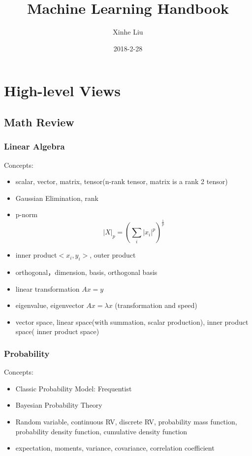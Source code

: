 \documentclass[11pt, openany]{book}              %
\title{\bf Machine Learning Handbook}    %
\author{Xinhe Liu}              %
\date{2018-2-28}                           %
\begin{document}
\maketitle                              %
\tableofcontents                        %
\mainmatter                             %

\part{High-level Views}
\chapter{Math Review}

\section{Linear Algebra}

Concepts:

\begin{itemize}
    \item scalar, vector, matrix, tensor(n-rank tensor, matrix is a rank 2 tensor) 
    \item Gaussian Elimination, rank
    \item p-norm $$|X|_p = (\sum_i |x_i|^p)^{\frac{1}{p}}$$
    \item inner product$<x_i,y_i>$, outer product
    \item orthogonal，dimension, basis, orthogonal basis
    \item linear transformation $Ax = y$
    \item eigenvalue, eigenvector $Ax =\lambda x$ (transformation and speed)
    \item vector space, linear space(with summation, scalar production), inner product space( inner product space) 
\end{itemize}


\section{Probability}

Concepts:

\begin{itemize}
    \item Classic Probability Model: Frequentist 
    \item Bayesian Probability Theory 
    \item Random variable, continuous RV, discrete RV, probability mass function, probability density function, cumulative density function
    \item expectation, moments, variance, covariance, correlation coefficient
\end{itemize}
\end{document}
